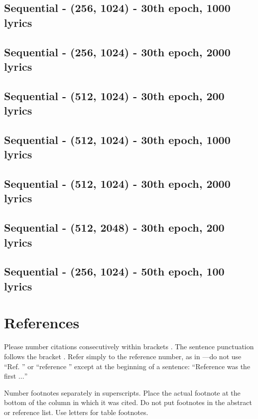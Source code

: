 \documentclass[conference]{IEEEtran}
\begin{document}
\subsection{Sequential - (256, 1024) - 30th epoch, 1000 lyrics}\label{Sequential256_1024_1000}
\subsection{Sequential - (256, 1024) - 30th epoch, 2000 lyrics}\label{Sequential256_1024_2000}
\subsection{Sequential - (512, 1024) - 30th epoch, 200 lyrics}\label{Sequential512_1024_200}
\subsection{Sequential - (512, 1024) - 30th epoch, 1000 lyrics}\label{Sequential512_1024_1000}
\subsection{Sequential - (512, 1024) - 30th epoch, 2000 lyrics}\label{Sequential512_1024_2000}
\subsection{Sequential - (512, 2048) - 30th epoch, 200 lyrics}\label{Sequential512_2048_200}
\subsection{Sequential - (256, 1024) - 50th epoch, 100 lyrics}\label{Sequential256_1024_100}

\section*{References}

Please number citations consecutively within brackets \cite{b1}. The 
sentence punctuation follows the bracket \cite{b2}. Refer simply to the reference 
number, as in \cite{b3}---do not use ``Ref. \cite{b3}'' or ``reference \cite{b3}'' except at 
the beginning of a sentence: ``Reference \cite{b3} was the first $\ldots$''

Number footnotes separately in superscripts. Place the actual footnote at 
the bottom of the column in which it was cited. Do not put footnotes in the 
abstract or reference list. Use letters for table footnotes.
\end{document}
